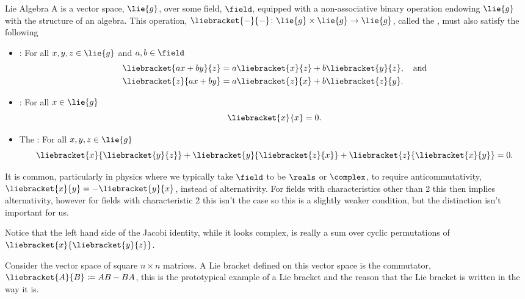 \begin{dfn}{Lie Algebra}{}
    A  is a vector space, \(\lie{g}\), over some field, \(\field\), equipped with a non-associative binary operation endowing \(\lie{g}\) with the structure of an algebra.
    This operation, \(\liebracket{-}{-} \colon \lie{g}\times\lie{g} \to \lie{g}\), called the , must also satisfy the following
    \begin{itemize}
        \item {}: For all \(x, y, z \in \lie{g}\) and \(a, b \in \field\)
        \begin{align}
            \liebracket{ax + by}{z} &= a\liebracket{x}{z} + b\liebracket{y}{z}, \quad\text{and}\\
            \liebracket{z}{ax + by} &= a\liebracket{z}{x} + b\liebracket{z}{y}.
        \end{align}
        \item {}: For all \(x \in \lie{g}\)
        \begin{equation}
            \liebracket{x}{x} = 0.
        \end{equation}
        \item The : For all \(x, y, z \in \lie{g}\)
        \begin{equation}
            \liebracket{x}{\liebracket{y}{z}} + \liebracket{y}{\liebracket{z}{x}} + \liebracket{z}{\liebracket{x}{y}} = 0.
        \end{equation}
    \end{itemize}
\end{dfn}
It is common, particularly in physics where we typically take \(\field\) to be \(\reals\) or \(\complex\), to require anticommutativity, \(\liebracket{x}{y} = -\liebracket{y}{x}\), instead of alternativity.
For fields with characteristics other than 2 this then implies alternativity, however for fields with characteristic 2 this isn't the case so this is a slightly weaker condition, but the distinction isn't important for us.

Notice that the left hand side of the Jacobi identity, while it looks complex, is really a sum over cyclic permutations of \(\liebracket{x}{\liebracket{y}{z}}\).

Consider the vector space of square \(n\times n\) matrices.
A Lie bracket defined on this vector space is the commutator, \(\liebracket{A}{B} \coloneqq AB - BA\), this is the prototypical example of a Lie bracket and the reason that the Lie bracket is written in the way it is.

